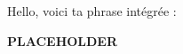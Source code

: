 \documentclass{article}
\begin{document}
Hello, voici ta phrase intégrée :

\textbf {{PLACEHOLDER}}
\end{document}
